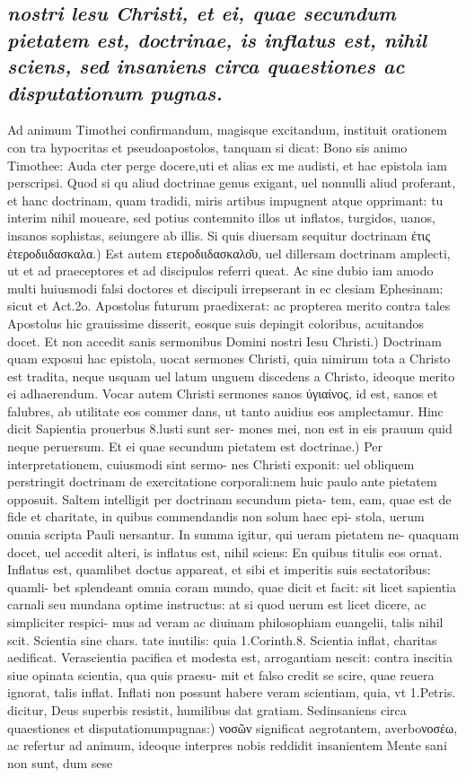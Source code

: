 \documentclass{article}
\begin{document}
\begin{pages}
\subsection*{\textit{nostri lesu Christi, et ei, quae secundum pietatem est, doctrinae, is inflatus est, nihil sciens, sed insaniens circa quaestiones ac disputationum pugnas. }}\pstart Ad animum Timothei confirmandum, magisque excitandum, instituit orationem con tra hypocritas et pseudoapostolos, tanquam si dicat: Bono sis animo Timothee: Auda cter perge docere,uti et alias ex me audisti, et hac epistola iam perscripsi. Quod si qu aliud doctrinae genus exigant, uel nonnulli aliud proferant, et hanc doctrinam, quam tradidi, miris artibus impugnent atque opprimant: tu interim nihil moueare, sed potius contemnito illos ut inflatos, turgidos, uanos, insanos sophistas, seiungere ab illis.  \pend\pstart Si quis diuersam sequitur doctrinam ἐτις ἐτεροδιιδασκαλα.) Est autem ετεροδιιδασκαλο͂υ, uel dillersam doctrinam amplecti, ut et ad praeceptores et ad discipulos referri queat. Ac sine dubio iam amodo multi huiusmodi falsi doctores et discipuli irrepserant in ec clesiam Ephesinam: sicut et Act.2o. Apostolus futurum praedixerat: ac propterea merito contra tales Apostolus hic grauissime disserit, eosque suis depingit coloribus, acuitandos docet.  \pend\pstart Et non accedit sanis sermonibus Domini nostri Iesu Christi.) Doctrinam quam exposui hac epistola, uocat sermones Christi, quia nimirum tota a Christo est tradita, neque usquam uel latum unguem discedens a Christo, ideoque merito ei adhaerendum. Vocar autem Christi sermones sanos ύγιαίνος, id est, sanos et falubres, ab utilitate eos commer dans, ut tanto auidius eos amplectamur. Hinc dicit Sapientia prouerbus 8.lusti sunt ser- mones mei, non est in eis prauum quid neque peruersum.  \pend\pstart Et ei quae secundum pietatem est doctrinae.) Per interpretationem, cuiusmodi sint sermo- nes Christi exponit: uel obliquem perstringit doctrinam de exercitatione corporali:nem huic paulo ante pietatem opposuit. Saltem intelligit per doctrinam secundum pieta- tem, eam, quae est de fide et charitate, in quibus commendandis non solum haec epi- stola, uerum omnia scripta Pauli uersantur. In summa igitur, qui ueram pietatem ne- quaquam docet, uel accedit alteri, is inflatus est, nihil sciens: En quibus titulis eos ornat. Inflatus est, quamlibet doctus appareat, et sibi et imperitis suis sectatoribus: quamli- bet splendeant omnia coram mundo, quae dicit et facit: sit licet sapientia carnali seu mundana optime instructus: at si quod uerum est licet dicere, ac simpliciter respici- mus ad veram ac diuinam philosophiam euangelii, talis nihil scit. Scientia sine chars. tate inutilis: quia 1.Corinth.8. Scientia inflat, charitas aedificat. Verascientia pacifica et modesta est, arrogantiam nescit: contra inscitia siue opinata scientia, qua quis praesu- mit et falso credit se scire, quae reuera ignorat, talis inflat. Inflati non possunt habere veram scientiam, quia, vt 1.Petris. dicitur, Deus superbis resistit, humilibus dat gratiam. Sedinsaniens circa quaestiones et disputationumpugnas:) νοσῶν significat aegrotantem, averboνοσέω, ac refertur ad animum, ideoque interpres nobis reddidit insanientem Mente sani non sunt, dum sese 
\end{pages}
\end{document}
